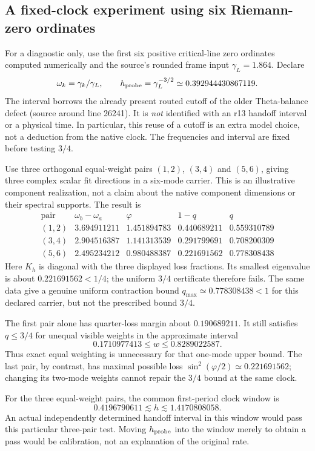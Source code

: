 \documentclass[11pt,a4paper]{article}
\begin{document}
\subsection{A fixed-clock experiment using six Riemann-zero ordinates}
For a diagnostic only, use the first six positive critical-line zero
ordinates computed numerically and the source's rounded frame input
$\gamma_L=1.864$. Declare
\[
 \omega_k=\gamma_k/\gamma_L,\qquad
 h_{\rm probe}=\gamma_L^{-3/2}
 \simeq0.392944430867119.
\]
The interval borrows the already present routed cutoff of the older
Theta-balance defect (source around line 26241). It is \emph{not}
identified with an r13 handoff interval or a physical time. In
particular, this reuse of a cutoff is an extra model choice, not a
deduction from the native clock. The frequencies and interval are
fixed before testing $3/4$.

Use three orthogonal equal-weight pairs $(1,2)$, $(3,4)$ and $(5,6)$,
giving three complex scalar fit directions in a six-mode carrier.
This is an illustrative component realization, not a claim about
the native component dimensions or their spectral supports. The result is
\[
\begin{array}{c|c|c|c|c}
\text{pair}&\omega_b-\omega_a&\varphi&1-q&q\\
\hline
(1,2)&3.694911211&1.451894783&0.440689211&0.559310789\\
(3,4)&2.904516387&1.141313539&0.291799691&0.708200309\\
(5,6)&2.495234212&0.980488387&0.221691562&0.778308438
\end{array}
\]
Here $K_h$ is diagonal with the three displayed loss fractions.
Its smallest eigenvalue is about $0.221691562<1/4$; the uniform
$3/4$ certificate therefore fails. The same data give a genuine
uniform contraction bound $q_{\max}\simeq0.778308438<1$ for this
declared carrier, but not the prescribed bound $3/4$.

The first pair alone has quarter-loss margin about $0.190689211$.
It still satisfies $q\le3/4$ for unequal visible weights in the
approximate interval
\[
 0.1710977413\le w\le0.8289022587.
\]
Thus exact equal weighting is unnecessary for that one-mode upper
bound. The last pair, by contrast, has maximal possible loss
$\sin^2(\varphi/2)\simeq0.221691562$; changing its two-mode weights
cannot repair the $3/4$ bound at the same clock.

For the three equal-weight pairs, the common first-period clock window is
\[
 0.4196790611\lesssim h\lesssim1.4170808058.
\]
An actual independently determined handoff interval in this window
would pass this particular three-pair test. Moving $h_{\rm probe}$
into the window merely to obtain a pass would be calibration,
not an explanation of the original rate.
\end{document}
